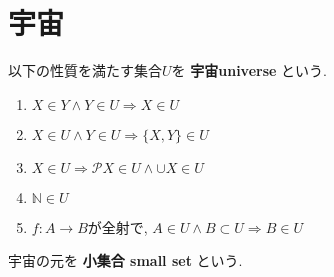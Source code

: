 \section{宇宙}
\begin{comment}
{\bf 内包原理}とは「集合$S$の元$x$に対してtrue か falseを返す関数$\varphi:S\rightarrow\{\mathrm{true},\mathrm{false}\}$が与えられたとき, 新たな集合
$
\{x\in S\mid\varphi(x)=\mathrm{true}\}
$
を構成できる」という集合が満たすべき性質のことをいう. 

ここまで, 集合を「ものの集まり」と素朴に定義してきたが, 次のような集合$R$を内包原理に基づいて構成しようとすると矛盾が生じる.\footnote{ラッセルのパラドックスと呼ばれる}
\[
R=\{X\mid X\notin X\}
\]
もし$R\in R$であると仮定すると, $R$の定義により$R\notin R$となる.
他方, $R\notin R$と仮定すると, $R$の定義より$R\in R$となってしまう.

このような矛盾が発生しないようにするため, {\bf 宇宙universe}という概念を導入する.
\end{comment}
\begin{Def}
以下の性質を満たす集合$U$を
{\bf 宇宙universe}
という.
\begin{enumerate}
\item $X\in Y\land Y\in U\Rightarrow X\in U$
\item $X\in U\land Y\in U\Rightarrow\{X,Y\}\in U$
\item $X\in U\Rightarrow \mathcal{P}X\in U\land \cup X\in U$
\item $\mathbb{N}\in U$
\item $f:A\rightarrow B$が全射で, $A\in U\land B\subset U\Rightarrow B \in U$
\end{enumerate}
\end{Def}
\begin{Def}
宇宙の元を
{\bf 小集合 small set}
という.
\end{Def}
\begin{comment}
\begin{Def}
$a$と$b$が小集合のとき関数$f:a\rightarrow b$を{\bf 小関数 small function}という.
\end{Def}

\begin{caution}
「宇宙」は小集合の全体である.
\end{caution}
\begin{Prop}
「宇宙」は小集合ではない
\end{Prop}
\section{類}
\begin{Def}
「宇宙」の部分集合を{\bf 類 class} という.
\end{Def}
\begin{Prop}
「宇宙」は類である.
\end{Prop}

\begin{Def}
小集合でない類を{\bf 真類 proper class}という.
\end{Def}
\begin{Prop}
「宇宙」は真類である.
\end{Prop}
\end{comment}
